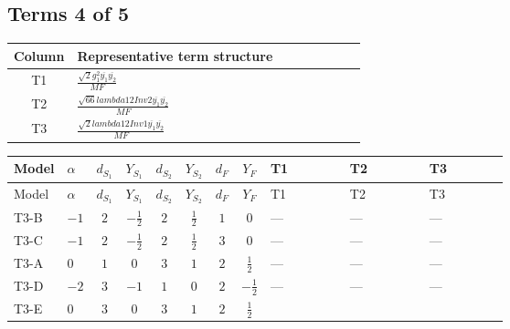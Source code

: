 \documentclass[8pt]{article}
\begin{document}
\begin{landscape}
\subsection*{Terms 4 of 5}
\begin{center}
\begin{tabular}{@{}c >{\raggedright\arraybackslash}p{0.82\linewidth}@{}}
\toprule
Column & Representative term structure \\
\midrule
T1 & \(\displaystyle \frac{\sqrt{2} g_{1}^{2} \overline{y_{1}} \overline{y_{2}}}{MF}\) \\
\midrule
T2 & \(\displaystyle \frac{\sqrt{66} lambda12Inv2 \overline{y_{1}} \overline{y_{2}}}{MF}\) \\
\midrule
T3 & \(\displaystyle \frac{\sqrt{2} lambda12Inv1 \overline{y_{1}} \overline{y_{2}}}{MF}\) \\
\midrule
\bottomrule
\end{tabular}
\end{center}
\smallskip
\tiny
\begin{longtable}{@{}llcccccc >{\raggedright\arraybackslash}p{0.21\linewidth} >{\raggedright\arraybackslash}p{0.21\linewidth} >{\raggedright\arraybackslash}p{0.21\linewidth}@{}}
\toprule
Model & $\alpha$ & $d_{S_1}$ & $Y_{S_1}$ & $d_{S_2}$ & $Y_{S_2}$ & $d_F$ & $Y_F$ & T1 & T2 & T3 \\
\midrule
\endfirsthead
\toprule
Model & $\alpha$ & $d_{S_1}$ & $Y_{S_1}$ & $d_{S_2}$ & $Y_{S_2}$ & $d_F$ & $Y_F$ & T1 & T2 & T3 \\
\midrule
\endhead
T3-B & $-1$ & $2$ & $-\frac{1}{2}$ & $2$ & $\frac{1}{2}$ & $1$ & $0$ & --- & --- & --- \\
\midrule
T3-C & $-1$ & $2$ & $-\frac{1}{2}$ & $2$ & $\frac{1}{2}$ & $3$ & $0$ & --- & --- & --- \\
\midrule
T3-A & $0$ & $1$ & $0$ & $3$ & $1$ & $2$ & $\frac{1}{2}$ & --- & --- & --- \\
\midrule
T3-D & $-2$ & $3$ & $-1$ & $1$ & $0$ & $2$ & $-\frac{1}{2}$ & --- & --- & --- \\
\midrule
T3-E & $0$ & $3$ & $0$ & $3$ & $1$ & $2$ & $\frac{1}{2}$ & \scriptsize\adjustbox{max width=\linewidth}{$\begin{gathered} - \frac{3 \sqrt{2} g_{1}^{2} \overline{y_{1}} \overline{y_{2}}}{16 MF}\end{gathered}$} & \scriptsize\adjustbox{max width=\linewidth}{$\begin{gathered} - \frac{3 \sqrt{66} lambda12Inv2 \overline{y_{1}} \overline{y_{2}}}{44 MF}\end{gathered}$} & \scriptsize\adjustbox{max width=\linewidth}{$\begin{gathered} \frac{\sqrt{2} lambda12Inv1 \overline{y_{1}} \overline{y_{2}}}{4 MF}\end{gathered}$} \\
\midrule
\bottomrule
\end{longtable}
\clearpage

\end{landscape}
\end{document}
